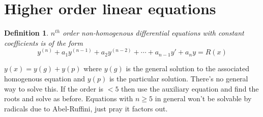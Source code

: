 \documentclass[oneside,11pt,pdftex,final]{book}%
\numberwithin{equation}{section}
\newtheorem{example}[theorem]{Example}
\newtheorem{definition}[theorem]{Definition}
\numberwithin{section}{chapter}
\numberwithin{equation}{chapter}
\begin{document}
\section{Higher order linear equations}
\begin{definition}
	$ n^{th} $ order non-homogenous differential equations with constant coefficients is of the form \[ y^{(n)} +a_1y^{(n-1)}+a_2y^{(n-2)}+\cdots+a_{n-1}y'+a_ny=R(x)\]
\end{definition}
$ y(x) =y(g)+y(p)$ where $ y(g) $ is the general solution to the associated homogenous equation and $ y(p) $ is the particular solution. There's no general way to solve this. If the order is $ <5 $ then use the auxiliary equation and find the roots and solve as before. Equations with $ n\geq5 $ in general won't be solvable by radicals due to Abel-Ruffini, just pray it factors out.

%
%
%
%
\end{document}
